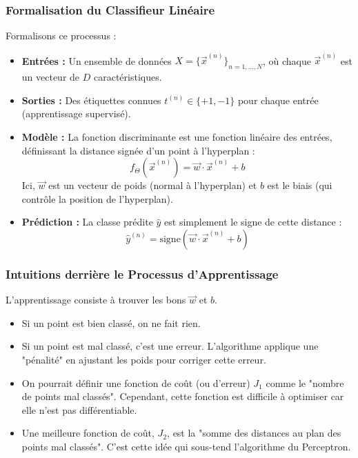 \documentclass[12pt]{article}
\begin{document}
\subsubsection{Formalisation du Classifieur Linéaire}
Formalisons ce processus :
\begin{itemize}
    \item \textbf{Entrées :} Un ensemble de données $X = \{\vec{x}^{(n)}\}_{n=1,...,N}$, où chaque $\vec{x}^{(n)}$ est un vecteur de $D$ caractéristiques.
    \item \textbf{Sorties :} Des étiquettes connues $t^{(n)} \in \{+1, -1\}$ pour chaque entrée (apprentissage supervisé).
    \item \textbf{Modèle :} La fonction discriminante est une fonction linéaire des entrées, définissant la distance signée d'un point à l'hyperplan : 
    \begin{equation}
    f_{\Theta}(\vec{x}^{(n)}) = \vec{w} \cdot \vec{x}^{(n)} + b
    \end{equation}
    Ici, $\vec{w}$ est un vecteur de poids (normal à l'hyperplan) et $b$ est le biais (qui contrôle la position de l'hyperplan).
    \item \textbf{Prédiction :} La classe prédite $\hat{y}$ est simplement le signe de cette distance :
    \begin{equation}
    \hat{y}^{(n)} = \text{signe}(\vec{w} \cdot \vec{x}^{(n)} + b)
    \end{equation}
\end{itemize}

\subsubsection{Intuitions derrière le Processus d'Apprentissage}
L'apprentissage consiste à trouver les bons $\vec{w}$ et $b$.
\begin{itemize}
    \item Si un point est bien classé, on ne fait rien.
    \item Si un point est mal classé, c'est une erreur. L'algorithme applique une "pénalité" en ajustant les poids pour corriger cette erreur.
    \item On pourrait définir une fonction de coût (ou d'erreur) $J_1$ comme le "nombre de points mal classés". Cependant, cette fonction est difficile à optimiser car elle n'est pas différentiable.
    \item Une meilleure fonction de coût, $J_2$, est la "somme des distances au plan des points mal classés". C'est cette idée qui sous-tend l'algorithme du Perceptron.
\end{itemize}
\end{document}

